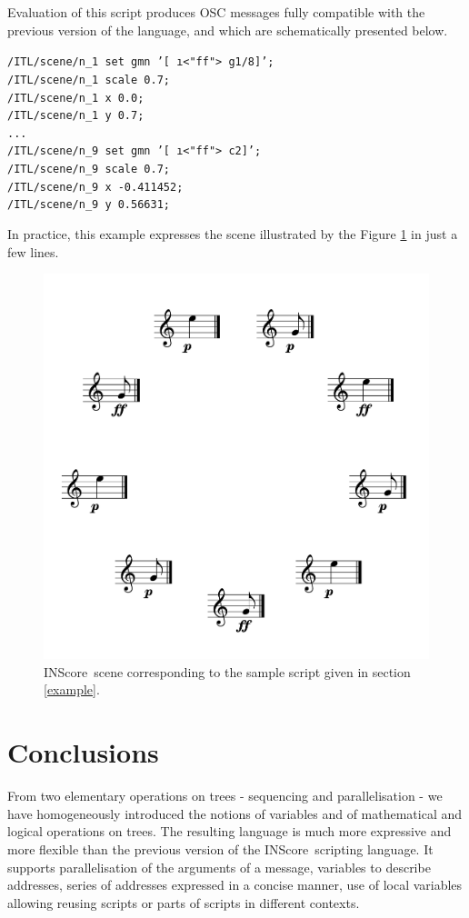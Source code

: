 \documentclass[runningheads]{llncs}
\newcommand{\IS}		{INScore}
\newcommand{\code}	[2][0.9]	{\vspace{0mm}\begin{center}\colorbox{mygrey}{
							\begin{minipage}[t]{#1\columnwidth} 
							{\small \texttt{#2}}
							\end{minipage}}\end{center}}
\begin{document}
Evaluation of this script produces OSC messages fully compatible with the previous version of the language, and which are schematically presented below. 
\code[1]{/ITL/scene/n\_1 set gmn '[ \i<"ff"> g1/8]';\\
/ITL/scene/n\_1 scale 0.7;\\
/ITL/scene/n\_1 x 0.0;\\
/ITL/scene/n\_1 y 0.7;\\
...\\
/ITL/scene/n\_9 set gmn '[ \i<"ff"> c2]';\\
/ITL/scene/n\_9 scale 0.7;\\
/ITL/scene/n\_9 x -0.411452;\\
/ITL/scene/n\_9 y 0.56631;
}

In practice, this example expresses the scene illustrated by the Figure \ref{samplescene} in just a few lines.  

\begin{figure}[htbp]
\begin{center}
\includegraphics[width=0.65\columnwidth]{imgs/scene}
\caption{\IS\ scene corresponding to the sample script given in section \ref{example}.}
\label{samplescene}
\end{center}
\end{figure}


\section{Conclusions}
From two elementary operations on trees - sequencing and parallelisation - we have homogeneously introduced the notions of variables and of mathematical and logical operations on trees. The resulting language is much more expressive and more flexible than the  previous version of the \IS\ scripting language. 
It supports parallelisation of the arguments of a message, variables to describe addresses, series of addresses expressed in a concise manner, use of local variables allowing reusing scripts or parts of scripts in different contexts.



\balance


\end{document}
